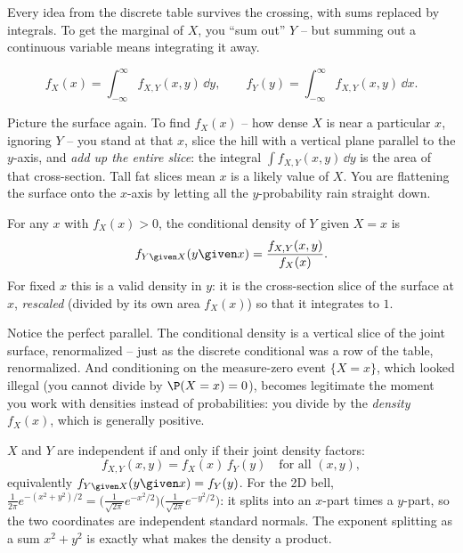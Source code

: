 Every idea from the discrete table survives the crossing, with sums replaced by
integrals. To get the marginal of $X$, you ``sum out'' $Y$ -- but summing out a
continuous variable means integrating it away.

\begin{definition}
\label{ch13:def-marginal-pdf}
\[
  f_X(x) = \int_{-\infty}^{\infty} f_{X,Y}(x,y)\,\dd y,
  \qquad
  f_Y(y) = \int_{-\infty}^{\infty} f_{X,Y}(x,y)\,\dd x.
\]
\end{definition}

\begin{intuitionbox}
Picture the surface again. To find $f_X(x)$ -- how dense $X$ is near a particular
$x$, ignoring $Y$ -- you stand at that $x$, slice the hill with a vertical plane
parallel to the $y$-axis, and \emph{add up the entire slice}: the integral
$\int f_{X,Y}(x,y)\,\dd y$ is the area of that cross-section. Tall fat slices mean
$x$ is a likely value of $X$. You are flattening the surface onto the $x$-axis by
letting all the $y$-probability rain straight down.
\end{intuitionbox}

\begin{definition}
\label{ch13:def-cond-pdf}
For any $x$ with $f_X(x)>0$, the conditional density of $Y$ given $X=x$ is
\[
  f_{Y\given X}(y\given x) = \frac{f_{X,Y}(x,y)}{f_X(x)} .
\]
For fixed $x$ this is a valid density in $y$: it is the cross-section slice of the
surface at $x$, \emph{rescaled} (divided by its own area $f_X(x)$) so that it
integrates to $1$.
\end{definition}

Notice the perfect parallel. The conditional density is a vertical slice of the
joint surface, renormalized -- just as the discrete conditional was a row of the
table, renormalized. And conditioning on the measure-zero event $\{X=x\}$, which
looked illegal (you cannot divide by $\P(X=x)=0$), becomes legitimate the moment
you work with densities instead of probabilities: you divide by the
\emph{density} $f_X(x)$, which is generally positive.

\begin{definition}
\label{ch13:def-indep-cont}
$X$ and $Y$ are independent if and only if their joint density factors:
\[
  f_{X,Y}(x,y) = f_X(x)\,f_Y(y) \quad\text{for all } (x,y),
\]
equivalently $f_{Y\given X}(y\given x) = f_Y(y)$. For the 2D bell,
$\frac{1}{2\pi}e^{-(x^2+y^2)/2} = \big(\tfrac{1}{\sqrt{2\pi}}e^{-x^2/2}\big)
\big(\tfrac{1}{\sqrt{2\pi}}e^{-y^2/2}\big)$: it splits into an $x$-part times a
$y$-part, so the two coordinates are independent standard normals. The exponent
splitting as a sum $x^2+y^2$ is exactly what makes the density a product.
\end{definition}

